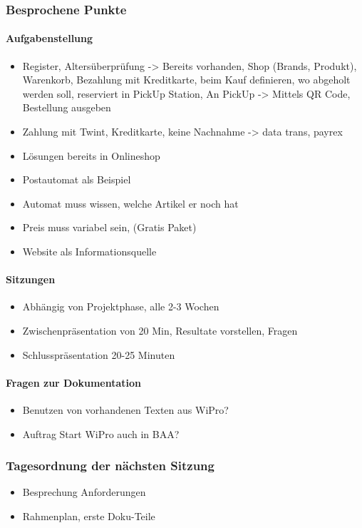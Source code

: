 \subsubsection{Besprochene Punkte}
\paragraph{Aufgabenstellung}
	\begin{itemize}
		\item Register, Altersüberprüfung -> Bereits vorhanden, Shop (Brands, Produkt), Warenkorb, Bezahlung mit Kreditkarte, beim Kauf definieren, wo abgeholt werden soll, reserviert in PickUp Station, An PickUp -> Mittels QR Code, Bestellung ausgeben
		\item Zahlung mit Twint, Kreditkarte, keine Nachnahme -> data trans, payrex
		\item Lösungen bereits in Onlineshop 
		\item Postautomat als Beispiel
		\item Automat muss wissen, welche Artikel er noch hat
		\item Preis muss variabel sein, (Gratis Paket)
		\item Website als Informationsquelle
	 	\end{itemize}
\paragraph{Sitzungen}
	\begin{itemize}
		\item Abhängig von Projektphase, alle 2-3 Wochen
		\item Zwischenpräsentation von 20 Min, Resultate vorstellen, Fragen
		\item Schlusspräsentation 20-25 Minuten
	\end{itemize}	
\paragraph{Fragen zur Dokumentation}
\begin{itemize}
	\item Benutzen von vorhandenen Texten aus WiPro?
	\item Auftrag Start WiPro auch in BAA?
\end{itemize}
\subsubsection{Tagesordnung der nächsten Sitzung}
\begin{itemize}
	\item Besprechung Anforderungen 
	\item Rahmenplan, erste Doku-Teile
\end{itemize}
\newpage

